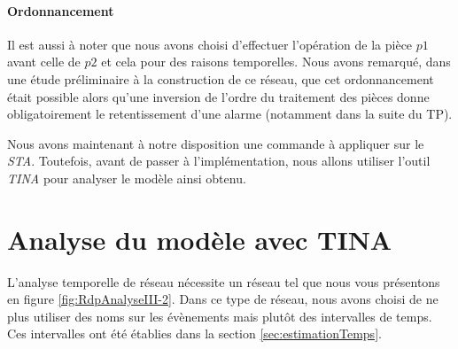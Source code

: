 \paragraph*{Ordonnancement}
Il est aussi à noter que nous avons choisi d'effectuer l'opération de la pièce $p1$ avant celle de $p2$ et cela pour des raisons temporelles. Nous avons remarqué, dans une étude préliminaire à la construction de ce réseau, que cet ordonnancement était possible alors qu'une inversion de l'ordre du traitement des pièces donne obligatoirement le retentissement d'une alarme (notamment dans la suite du TP).


Nous avons maintenant à notre disposition une commande à appliquer sur le \emph{STA}. Toutefois, avant de passer à l'implémentation, nous allons utiliser l'outil \emph{TINA} pour analyser le modèle ainsi obtenu.	


\section{Analyse du modèle avec TINA}
L'analyse temporelle de réseau nécessite un réseau tel que nous vous présentons en figure \ref{fig:RdpAnalyseIII-2}. Dans ce type de réseau, nous avons choisi de ne plus utiliser des noms sur les évènements mais plutôt des intervalles de temps. Ces intervalles ont été établies dans la section \ref{sec:estimationTemps}.

